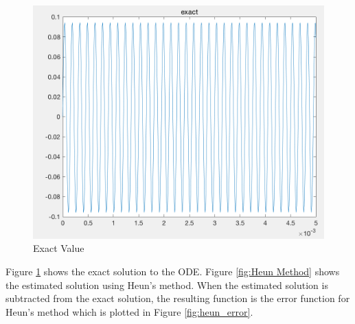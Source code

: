 \documentclass[11pt,a4paper]{article}
\begin{document}
\begin{figure}[h]
    \centering
    \includegraphics[scale=0.5]{Ex2_Figs/heun_error_exact}
    \caption{Exact Value}
    \label{fig:Exact Value}
\end{figure}

Figure \ref{fig:Exact Value} shows the exact solution to the ODE. Figure \ref{fig:Heun Method} shows the estimated solution using Heun's method. When the estimated solution is subtracted from the exact solution, the resulting function is the error function for Heun's method which is plotted in Figure \ref{fig:heun_error}.
\end{document}
